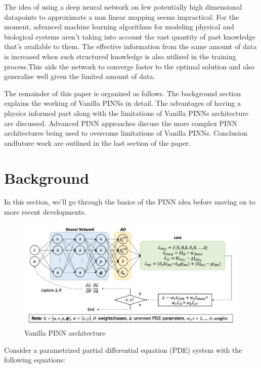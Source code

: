 \documentclass[conference,compsoc]{IEEEtran}
\begin{document}
The idea of using a deep neural network on few potentially high dimensional datapoints to approximate a non linear mapping seems impractical\cite{karniadakis2021physics}. For the moment, advanced machine learning algorithms for modeling physical and biological systems aren't taking into account the vast quantity of past knowledge that's available to them\cite{cai2021physics}. The effective information from the same amount of data is increased when such structured knowledge is also utilised in the training process\cite{karniadakis2021physics}.This aids the network to converge faster to the optimal solution and also generalise well given the limited amount of data\cite{karniadakis2021physics}\cite{mishra2020estimates}.

The remainder of this paper is organized as follows. The background section explains the working of Vanilla PINNs in detail. The advantages of having a physics informed part along with the limitations of Vanilla PINNs architecture are discussed. Advanced PINN approaches discuss the more complex PINN architectures being used to overcome limitations of Vanilla PINNs. Conclusion andfuture work are outlined in the last section of the paper.

\section{Background}
In this section, we'll go through the basics of the PINN idea before moving on to more recent developments.
\begin{figure}[h]
    \centering
    \includegraphics[scale=0.8]{figures/PINN_architecture.JPG}
    \caption{Vanilla PINN architecture\cite{raissi2019physics}}
\end{figure}

Consider a parametrized partial differential equation (PDE) system with the following equations:
\end{document}
